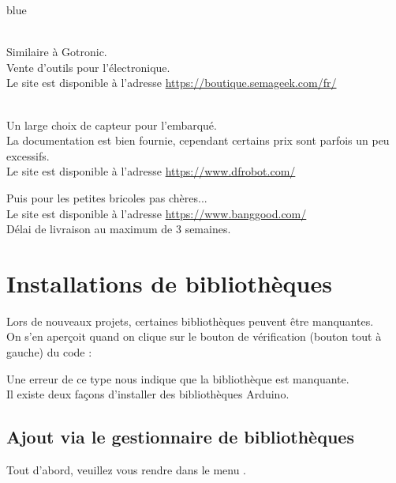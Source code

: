 {\begin{items}{blue}{\Circle}
    \item {} \\ Similaire à Gotronic.\\
    Vente d'outils pour l'électronique.\\
    Le site est disponible à l'adresse \url{https://boutique.semageek.com/fr/}


    \item {} \\ Un large choix de capteur pour l'embarqué.\\
    La documentation est bien fournie, cependant certains prix sont parfois un peu excessifs.\\
    Le site est disponible à l'adresse \url{https://www.dfrobot.com/}

    \item Puis  pour les petites bricoles pas chères... \\
    Le site est disponible à l'adresse \url{https://www.banggood.com/}\\
    Délai de livraison au maximum de 3 semaines.


\end{items}\chapter{Installations de bibliothèques}

  Lors de nouveaux projets, certaines bibliothèques peuvent être manquantes.\\
  On s'en aperçoit quand on clique sur le bouton de vérification (bouton tout à gauche) du code :



  Une erreur de ce type nous indique que la bibliothèque  est manquante.\\

  
  Il existe deux façons d'installer des bibliothèques Arduino.

  \section{Ajout via le gestionnaire de bibliothèques}

  Tout d'abord, veuillez vous rendre dans le menu .


}
